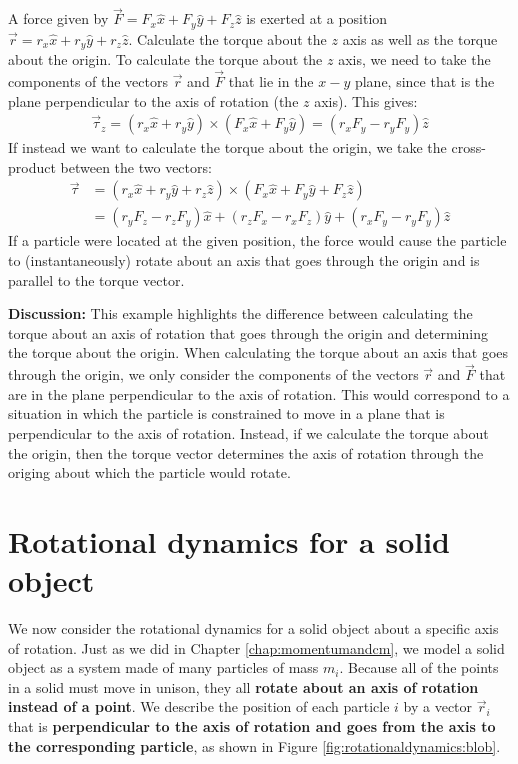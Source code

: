 \begin{example}{A force given by $\vec F=F_x\hat x + F_y \hat y + F_z \hat z$ is exerted at a position $\vec r=r_x \hat x + r_y \hat y + r_z\hat z$. Calculate the torque about the $z$ axis as well as the torque about the origin.}
To calculate the torque about the $z$ axis, we need to take the components of the vectors $\vec r$ and $\vec F$ that lie in the $x-y$ plane, since that is the plane perpendicular to the axis of rotation (the $z$ axis). This gives:
\begin{align*}
\vec\tau_z =(r_x \hat x + r_y \hat y) \times (F_x\hat x + F_y \hat y) =(r_xF_y-r_yF_y)\hat z
\end{align*}
If instead we want to calculate the torque about the origin, we take the cross-product between the two vectors:
\begin{align*}
\vec\tau &=(r_x \hat x + r_y \hat y+ r_z\hat z) \times (F_x\hat x + F_y \hat y+ F_z \hat z)\\
&=(r_yF_z-r_zF_y)\hat x+(r_zF_x-r_xF_z)\hat y+(r_xF_y-r_yF_y)\hat z
\end{align*}
If a particle were located at the given position, the force would cause the particle to (instantaneously) rotate about an axis that goes through the origin and is parallel to the torque vector. 

\textbf{Discussion:} This example highlights the difference between calculating the torque about an axis of rotation that goes through the origin and determining the torque about the origin. When calculating the torque about an axis that goes through the origin, we only consider the components of the vectors $\vec r$ and $\vec F$ that are in the plane perpendicular to the axis of rotation. This would correspond to a situation in which the particle is constrained to move in a plane that is perpendicular to the axis of rotation. Instead, if we calculate the torque about the origin, then the torque vector determines the axis of rotation through the origing about which the particle would rotate. 
\end{example}


\section{Rotational dynamics for a solid object}
We now consider the rotational dynamics for a solid object about a specific axis of rotation. Just as we did in Chapter \ref{chap:momentumandcm}, we model a solid object as a system made of many particles of mass $m_i$. Because all of the points in a solid must move in unison, they all \textbf{rotate about an axis of rotation instead of a point}. We describe the position of each particle $i$ by a vector $\vec r_i$ that is \textbf{perpendicular to the axis of rotation and goes from the axis to the corresponding particle}, as shown in Figure \ref{fig:rotationaldynamics:blob}.


